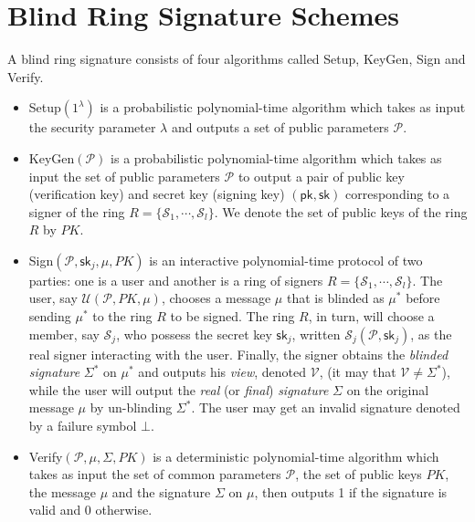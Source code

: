 \documentclass[runningheads]{llncs}
\begin{document}
\section{Blind Ring Signature Schemes} \label{brs}
A blind ring signature consists of four algorithms called  \textsf{Setup}, \textsf{KeyGen}, \textsf{Sign} and \textsf{Verify}.
\begin{itemize}
	\item \textsf{Setup}$(1^{\lambda})$ is a probabilistic polynomial-time algorithm which takes as input the security parameter $\lambda$ and outputs a set of public parameters $\mathcal{P}$.
	\item \textsf{KeyGen}$(\mathcal{P})$ is a probabilistic polynomial-time algorithm which takes as input the set of public parameters $\mathcal{P}$ to output a pair of public key (verification key) and secret key (signing key) $(\mathsf{pk},\mathsf{sk})$ corresponding to a signer of the ring $R=\{\mathcal{S}_1, \cdots, \mathcal{S}_l\}$. We denote the set of public keys of the ring $R$ by $PK$.
	
	\item \textsf{Sign}$(\mathcal{P},\mathsf{sk}_j,\mu, PK)$ is an interactive polynomial-time protocol of two parties: one is a user and another is a ring of signers $R=\{\mathcal{S}_1, \cdots, \mathcal{S}_l\}$. The user, say  $\mathcal{U}(\mathcal{P}, PK, \mu)$, chooses a message $\mu$ that is blinded as $\mu^*$ before sending $\mu^*$ to the ring $R$ to be signed. The ring $R$, in turn, will choose a member, say $\mathcal{S}_j$, who possess the secret key  $\mathsf{sk}_j$, written $\mathcal{S}_j(\mathcal{P}, \mathsf{sk}_j)$, as the real signer interacting with the user. Finally, the signer obtains the \textit{blinded signature} $\Sigma^*$ on $\mu^*$ and outputs his \textit{view}, denoted $\mathcal{V}$, (it may that $\mathcal{V} \neq \Sigma^*$), while the user will output the \textit{real} (or \textit{final}) \textit{signature} $\Sigma$ on the original message $\mu$ by un-blinding $\Sigma^*$. The user may get an invalid signature denoted by a failure symbol $\bot$.
	
	\item \textsf{Verify}$(\mathcal{P}, \mu, \Sigma, PK)$ is a deterministic polynomial-time algorithm which takes as input the set of common parameters $\mathcal{P}$, the set of public keys $PK$, the message $\mu$ and the signature $\Sigma$ on $\mu$, then outputs 1 if the signature is valid and 0 otherwise. 
\end{itemize}
\end{document}

